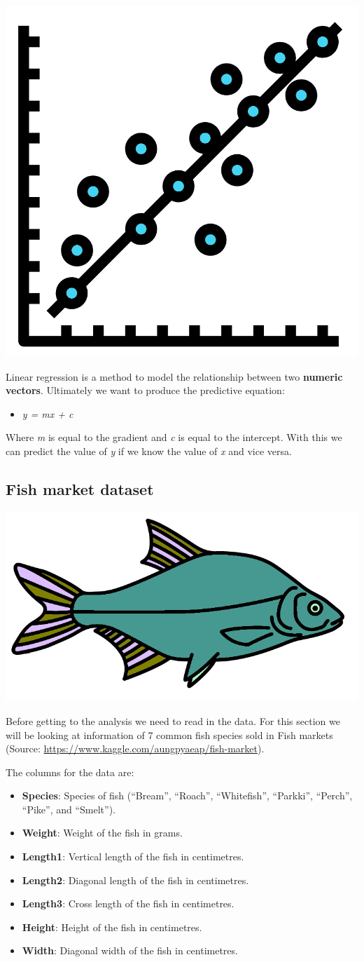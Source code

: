 \documentclass[]{book}
\providecommand{\tightlist}{%
  \setlength{\itemsep}{0pt}\setlength{\parskip}{0pt}}
\begin{document}
\begin{center}\includegraphics[width=0.2\linewidth]{figures/linear_regression} \end{center}

Linear regression is a method to model the relationship between two
\textbf{numeric vectors}. Ultimately we want to produce the predictive
equation:

\begin{itemize}
\tightlist
\item
  \emph{y = mx + c}
\end{itemize}

Where \emph{m} is equal to the gradient and \emph{c} is equal to the
intercept. With this we can predict the value of \emph{y} if we know the
value of \emph{x} and vice versa.

\subsection{Fish market dataset}\label{fish-market-dataset}

\begin{center}\includegraphics[width=0.3\linewidth]{figures/bream} \end{center}

Before getting to the analysis we need to read in the data. For this
section we will be looking at information of 7 common fish species sold
in Fish markets (Source:
\url{https://www.kaggle.com/aungpyaeap/fish-market}).

The columns for the data are:

\begin{itemize}
\tightlist
\item
  \textbf{Species}: Species of fish (``Bream'', ``Roach'',
  ``Whitefish'', ``Parkki'', ``Perch'', ``Pike'', and ``Smelt'').
\item
  \textbf{Weight}: Weight of the fish in grams.
\item
  \textbf{Length1}: Vertical length of the fish in centimetres.
\item
  \textbf{Length2}: Diagonal length of the fish in centimetres.
\item
  \textbf{Length3}: Cross length of the fish in centimetres.
\item
  \textbf{Height}: Height of the fish in centimetres.
\item
  \textbf{Width}: Diagonal width of the fish in centimetres.
\end{itemize}
\end{document}
